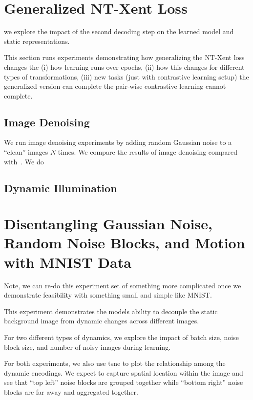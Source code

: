 \documentclass[11pt]{article}
\begin{document}
\newpage

\section{Generalized NT-Xent Loss}\label{sec:gen_nt_xent}

we explore the impact of the second decoding step on the learned model and static representations.

This section runs experiments demonstrating how generalizing the NT-Xent loss changes the (i) how learning runs over epochs, (ii) how this changes for different types of transformations, (iii) new tasks (just with contrastive learning setup) the generalized version can complete the pair-wise contrastive learning cannot complete.



\subsection{Image Denoising}\label{subsec:gnt_xent_denoising}

We run image denoising experiments by adding random Gaussian noise to a ``clean'' images $N$ times. We compare the results of image denoising compared with~\cite{xia2019training,metzler2016denoising,li2013efficient}. We do 

\subsection{Dynamic Illumination}\label{subsec:gnt_xent_illumination}

\section{Disentangling Gaussian Noise, Random Noise Blocks, and Motion with MNIST Data}\label{sec:disent_mnist}

Note, we can re-do this experiment set of something more complicated once we demonstrate feasibility with something small and simple like MNIST.

This experiment demonstrates the models ability to decouple the static background image from dynamic changes across different images.

For two different types of dynamics, we explore the impact of batch size, noise block size, and number of noisy images during learning.

For both experiments, we also use tsne to plot the relationship among the dynamic encodings. We expect to capture spatial location within the image and see that ``top left'' noise blocks are grouped together while ``bottom right'' noise blocks are far away and aggregated together.
\end{document}
